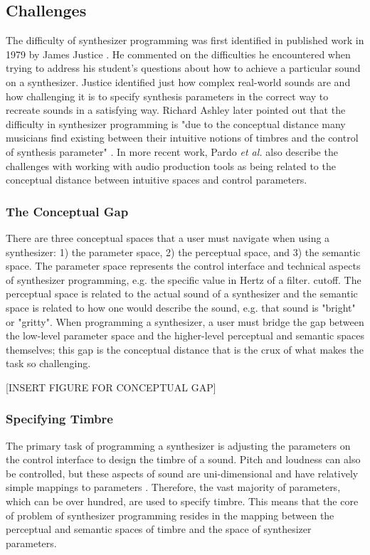 \subsection{Challenges}
The difficulty of synthesizer programming was first identified in published work in 1979 by James Justice \cite{justice1979analytic}. He commented on the difficulties he encountered when trying to address his student's questions about how to achieve a particular sound on a synthesizer. Justice identified just how complex real-world sounds are and how challenging it is to specify synthesis parameters in the correct way to recreate sounds in a satisfying way. Richard Ashley later pointed out that the difficulty in synthesizer programming is "due to the conceptual distance many musicians find existing between their intuitive notions of timbres and the control of synthesis parameter" \cite{ashley1986knowledge}. In more recent work, Pardo \textit{et al.} also describe the challenges with working with audio production tools as being related to the conceptual distance between intuitive spaces and control parameters. 

\subsubsection{The Conceptual Gap}
There are three conceptual spaces that a user must navigate when using a synthesizer: 1) the parameter space, 2) the perceptual space, and 3) the semantic space. The parameter space represents the control interface and technical aspects of synthesizer programming, e.g. the specific value in Hertz of a filter. cutoff. The perceptual space is related to the actual sound of a synthesizer and the semantic space is related to how one would describe the sound, e.g. that sound is "bright" or "gritty". When programming a synthesizer, a user must bridge the gap between the low-level parameter space and the higher-level perceptual and semantic spaces themselves; this gap is the conceptual distance that is the crux of what makes the task so challenging.

[INSERT FIGURE FOR CONCEPTUAL GAP]

\subsubsection{Specifying Timbre}
The primary task of programming a synthesizer is adjusting the parameters on the control interface to design the timbre of a sound. Pitch and loudness can also be controlled, but these aspects of sound are uni-dimensional and have relatively simple mappings to parameters \cite{seago2004critical}. Therefore, the vast majority of parameters, which can be over hundred, are used to specify timbre. This means that the core of problem of synthesizer programming resides in the mapping between the perceptual and semantic spaces of timbre and the space of synthesizer parameters.
 
